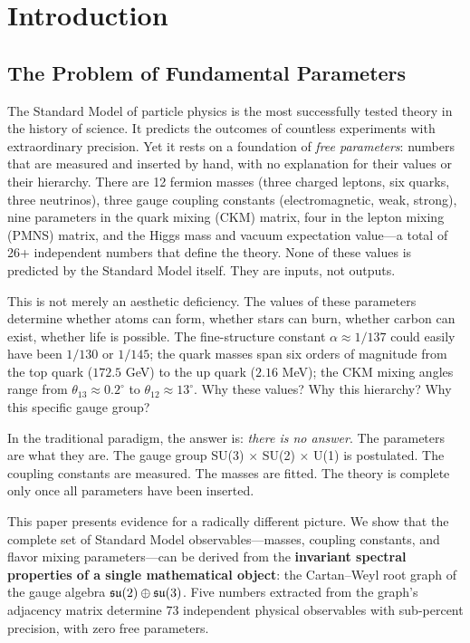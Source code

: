 \section{Introduction}\label{sec:introduction}

\subsection{The Problem of Fundamental Parameters}\label{sec:problem}

The Standard Model of particle physics is the most successfully tested theory in the history of science. It predicts the outcomes of countless experiments with extraordinary precision. Yet it rests on a foundation of \textit{free parameters}: numbers that are measured and inserted by hand, with no explanation for their values or their hierarchy. There are 12 fermion masses (three charged leptons, six quarks, three neutrinos), three gauge coupling constants (electromagnetic, weak, strong), nine parameters in the quark mixing (CKM) matrix, four in the lepton mixing (PMNS) matrix, and the Higgs mass and vacuum expectation value---a total of 26+ independent numbers that define the theory. None of these values is predicted by the Standard Model itself. They are inputs, not outputs.

This is not merely an aesthetic deficiency. The values of these parameters determine whether atoms can form, whether stars can burn, whether carbon can exist, whether life is possible. The fine-structure constant $\alpha \approx 1/137$ could easily have been $1/130$ or $1/145$; the quark masses span six orders of magnitude from the top quark ($172.5$ GeV) to the up quark ($2.16$ MeV); the CKM mixing angles range from $\theta_{13} \approx 0.2^\circ$ to $\theta_{12} \approx 13^\circ$. Why these values? Why this hierarchy? Why this specific gauge group?

In the traditional paradigm, the answer is: \textit{there is no answer}. The parameters are what they are. The gauge group SU(3) $\times$ SU(2) $\times$ U(1) is postulated. The coupling constants are measured. The masses are fitted. The theory is complete only once all parameters have been inserted.

This paper presents evidence for a radically different picture. We show that the complete set of Standard Model observables---masses, coupling constants, and flavor mixing parameters---can be derived from the \textbf{invariant spectral properties of a single mathematical object}: the Cartan--Weyl root graph of the gauge algebra $\mathfrak{su}(2) \oplus \mathfrak{su}(3)$. Five numbers extracted from the graph's adjacency matrix determine 73 independent physical observables with sub-percent precision, with zero free parameters.


